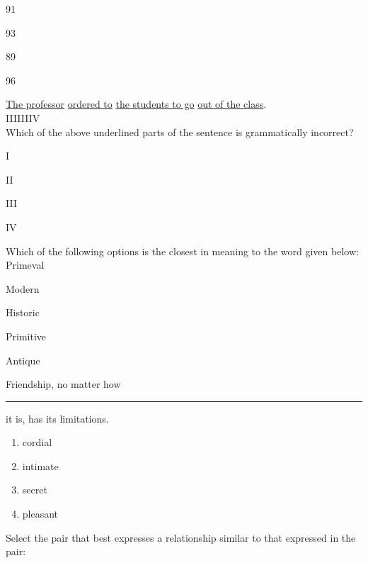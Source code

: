 \begin{enumerate}
\begin{multicols}{4}
\item 91
\item 93
\item 89
\item 96
\end{multicols}
\end{enumerate}
\item \underline{The professor} \underline{ordered to} \underline{the students to go} \underline{out of the class}.\\
\hspace{3cm}I\hspace{3cm}II\hspace{2cm}III\hspace{3cm}IV\\
Which of the above underlined parts of the sentence is grammatically incorrect?
\begin{enumerate}
\begin{multicols}{4}
\item I
\item II
\item III
\item IV
\end{multicols}
\end{enumerate}
\item Which of the following options is the closest in meaning to the word given below:\\
Primeval
\begin{enumerate}
\begin{multicols}{2}
\item Modern
\item Historic
\item Primitive
\item Antique
\end{multicols}
\end{enumerate}
\item Friendship, no matter how \rule{2cm}{0.15mm} it is, has its limitations.
\begin{enumerate}
\item cordial
\item intimate
\item secret
\item pleasant
\end{enumerate}
\item Select the pair that best expresses a relationship similar to that expressed in the pair:\\
